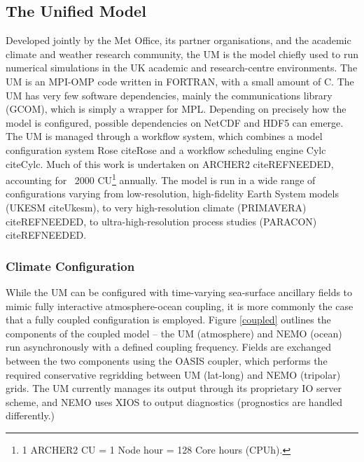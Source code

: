 \documentclass[twocolumn, 12pt]{paper}
\begin{document}
\subsection{The Unified Model}

Developed jointly by the Met Office, its partner organisations, and the academic climate and weather research community, the UM is the model chiefly used to run numerical simulations in the UK academic and research-centre environments.
The UM is an MPI-OMP code written in FORTRAN, with a small amount of C.
The UM has very few software dependencies, mainly the communications library (GCOM), which is simply a wrapper for MPL. Depending on precisely how the model is configured, possible dependencies on NetCDF and HDF5 can emerge.
The UM is managed through a workflow system, which combines a model configuration system Rose cite{Rose} and a workflow scheduling engine Cylc cite{Cylc}.
Much of this work is undertaken on ARCHER2 cite{REFNEEDED}, accounting for ~2000 CU\footnote{1 ARCHER2 CU = 1 Node hour = 128 Core hours (CPUh).} annually.
The model is run in a wide range of configurations varying from low-resolution, high-fidelity Earth System models (UKESM cite{Ukesm}), to very high-resolution climate (PRIMAVERA) cite{REFNEEDED}, to ultra-high-resolution process studies (PARACON) cite{REFNEEDED}.

\subsubsection{Climate Configuration}

While the UM can be configured with time-varying sea-surface ancillary fields to mimic fully interactive atmosphere-ocean coupling, it is more commonly the case that a fully coupled configuration is employed.
Figure \ref{coupled} outlines the components of the coupled model -- the UM (atmosphere) and NEMO (ocean) run asynchronously with a defined coupling frequency.
Fields are exchanged between the two components using the OASIS coupler, which performs the required conservative regridding between UM (lat-long) and NEMO (tripolar) grids.
The UM currently manages its output through its proprietary IO server scheme, and NEMO uses XIOS to output diagnostics (prognostics are handled differently.)
\end{document}
